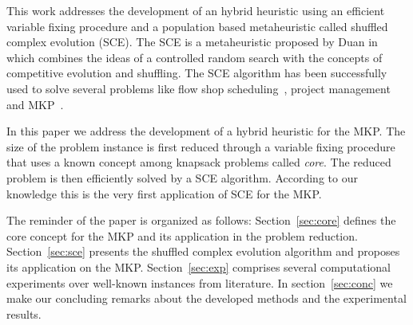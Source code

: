 This work addresses the development of an hybrid heuristic using an
efficient variable fixing procedure and a population based metaheuristic called
shuffled complex evolution (SCE).
The SCE is a metaheuristic proposed by Duan in \cite{duan1992effective}
which combines the ideas of a controlled random search with the concepts
of competitive evolution and shuffling.
The SCE algorithm has been successfully used to solve several problems
like flow shop scheduling~\cite{zhao2014shuffled}, project management~\cite{elbeltagi2007modified}
and MKP~\cite{baroni2015shuffled}.

In this paper we address the development of a hybrid heuristic for the MKP.
The size of the problem instance is first reduced through a variable fixing
procedure that uses a known concept among knapsack problems called \emph{core}.
The reduced problem is then efficiently solved by a SCE algorithm.
According to our knowledge this is the very first application of SCE
for the MKP.

The reminder of the paper is organized as follows:
Section~\ref{sec:core} defines the core concept for the MKP and its application
in the problem reduction.
Section~\ref{sec:sce} presents the shuffled complex evolution algorithm
and proposes its application on the MKP.
Section~\ref{sec:exp} comprises several computational experiments over well-known
instances from literature.
In section~\ref{sec:conc} we make our concluding remarks about the developed
methods and the experimental results.

